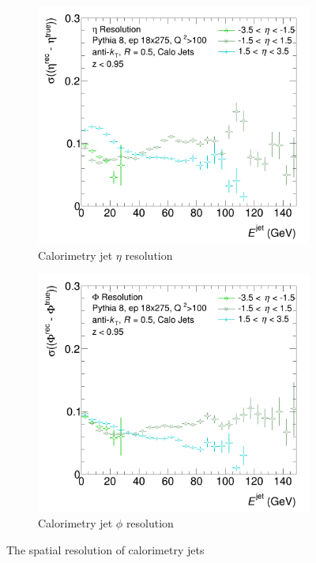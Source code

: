 \begin{figure}
    \centering
    \begin{subfigure}{0.4\textwidth}
        \centering
        \includegraphics[width=\linewidth]{figs/jet_plots/EtaReso_calo_grouped.png}
        \caption{Calorimetry jet $\eta$ resolution}
        \label{fig:calo_eta_resolution}
    \end{subfigure}
    \hfill
    \begin{subfigure}{0.4\textwidth}
        \centering
        \includegraphics[width=\linewidth]{figs/jet_plots/PhiReso_calo_grouped.png}
        \caption{Calorimetry jet $\phi$ resolution}
        \label{fig:calo_phi_resolution}
    \end{subfigure}
    \caption{The spatial resolution of calorimetry jets}
    \label{fig:calo_spatial_reso_scale}
\end{figure}